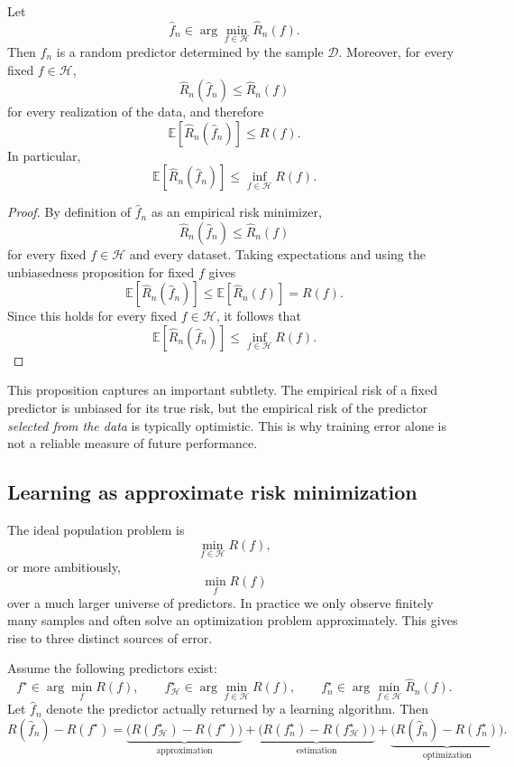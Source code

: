 \begin{proposition}
Let
\[
\hat f_n \in \arg\min_{f\in\mathcal H}\widehat R_n(f).
\]
Then $\hat f_n$ is a random predictor determined by the sample $\mathcal D$. Moreover, for every fixed $f\in\mathcal H$,
\[
\widehat R_n(\hat f_n)\le \widehat R_n(f)
\]
for every realization of the data, and therefore
\[
\mathbb E[\widehat R_n(\hat f_n)]\le R(f).
\]
In particular,
\[
\mathbb E[\widehat R_n(\hat f_n)]\le \inf_{f\in\mathcal H} R(f).
\]
\end{proposition}

\begin{proof}
By definition of $\hat f_n$ as an empirical risk minimizer,
\[
\widehat R_n(\hat f_n)\le \widehat R_n(f)
\]
for every fixed $f\in\mathcal H$ and every dataset. Taking expectations and using the unbiasedness proposition for fixed $f$ gives
\[
\mathbb E[\widehat R_n(\hat f_n)]
\le
\mathbb E[\widehat R_n(f)]
=
R(f).
\]
Since this holds for every fixed $f\in\mathcal H$, it follows that
\[
\mathbb E[\widehat R_n(\hat f_n)]\le \inf_{f\in\mathcal H}R(f).
\]
\end{proof}

This proposition captures an important subtlety. The empirical risk of a fixed predictor is unbiased for its true risk, but the empirical risk of the predictor \emph{selected from the data} is typically optimistic. This is why training error alone is not a reliable measure of future performance.

\subsection*{Learning as approximate risk minimization}

The ideal population problem is
\[
\min_{f\in\mathcal H} R(f),
\]
or more ambitiously,
\[
\min_{f} R(f)
\]
over a much larger universe of predictors. In practice we only observe finitely many samples and often solve an optimization problem approximately. This gives rise to three distinct sources of error.

\begin{proposition}
Assume the following predictors exist:
\[
f^\star \in \arg\min_f R(f),
\qquad
f_{\mathcal H}^\star \in \arg\min_{f\in\mathcal H} R(f),
\qquad
f_n^\star \in \arg\min_{f\in\mathcal H}\widehat R_n(f).
\]
Let $\hat f_n$ denote the predictor actually returned by a learning algorithm. Then
\[
R(\hat f_n)-R(f^\star)
=
\underbrace{\bigl(R(f_{\mathcal H}^\star)-R(f^\star)\bigr)}_{\text{approximation}}
+
\underbrace{\bigl(R(f_n^\star)-R(f_{\mathcal H}^\star)\bigr)}_{\text{estimation}}
+
\underbrace{\bigl(R(\hat f_n)-R(f_n^\star)\bigr)}_{\text{optimization}}.
\]
\end{proposition}

